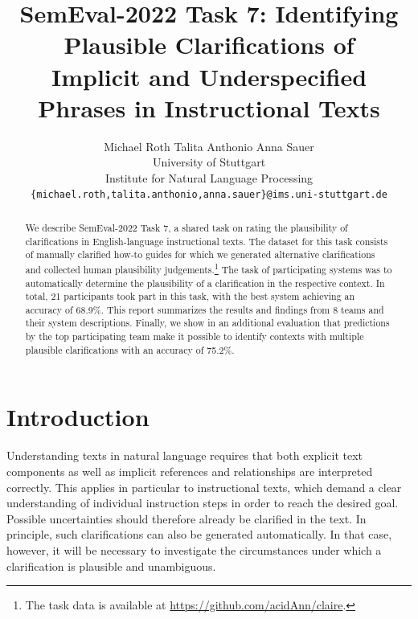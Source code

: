 \documentclass[11pt]{article}
\title{SemEval-2022 Task 7: Identifying Plausible Clarifications of\\ 
Implicit and Underspecified Phrases in Instructional Texts}
\author{Michael Roth \quad\quad Talita Anthonio
\quad\quad Anna Sauer 
\\
University of Stuttgart \\
Institute for Natural Language Processing \\
\small{\texttt{\{michael.roth,talita.anthonio,anna.sauer\}@ims.uni-stuttgart.de}}}
\begin{document}
\maketitle

\newcommand\ecfootnote[1]{%
\begingroup
\renewcommand\thefootnote{}\footnotetext{#1}%
\addtocounter{footnote}{-1}%
\endgroup
}

\begin{abstract}
We describe SemEval-2022 Task 7, a shared task on rating the plausibility of clarifications in English-language instructional texts. 
The dataset for this task consists of manually clarified how-to guides for which we generated alternative clarifications and collected human plausibility judgements.\footnote{The task data is available at \url{https://github.com/acidAnn/claire}.} The task of participating systems was to automatically determine the plausibility of a clarification in the respective context. In total, 21 participants took part in this task, with the best system achieving an accuracy of 68.9\%. This report summarizes the results and findings from 8 teams and their system descriptions. Finally, we show in an additional evaluation that predictions by the top participating team make it possible to identify contexts with multiple plausible clarifications with an accuracy of 75.2\%. 
\end{abstract}



\section{Introduction}
\label{sec:intro}

Understanding texts in natural language requires that both explicit text components as well as implicit references and relationships are interpreted correctly. This applies in particular to instructional texts, which demand a clear understanding of individual instruction steps in order to reach the desired goal. Possible uncertainties should therefore already be clarified in the text. In principle, such clarifications can also be generated automatically. In that case, however, it will be necessary to investigate the circumstances under which a clarification is plausible and unambiguous.
\end{document}
